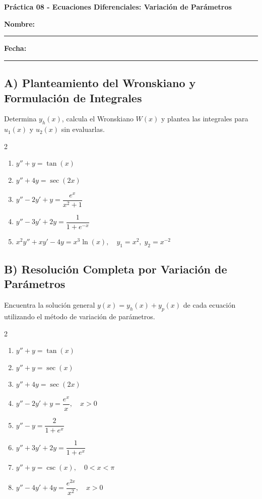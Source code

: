 \documentclass[a4paper,11pt]{article}
\begin{document}
\begin{center}
    \Large\textbf{Práctica 08 - Ecuaciones Diferenciales: Variación de Parámetros}\\[0.5cm]  
\end{center}
  \textbf{Nombre:} \rule{9cm}{0.4pt}  \textbf{Fecha:} \rule{4.5cm}{0.4pt}

\vspace{0.3cm}

\subsection*{A) Planteamiento del Wronskiano y Formulación de Integrales}
Determina $y_h(x)$, calcula el Wronskiano $W(x)$ y plantea las integrales para $u_1(x)$ y $u_2(x)$ sin evaluarlas.

\begin{multicols}{2}
\begin{enumerate}[itemsep=0.15cm]
    \item $y'' + y = \tan(x)$
    \item $y'' + 4y = \sec(2x)$
    \item $y'' - 2y' + y = \dfrac{e^x}{x^2 + 1}$
    \item $y'' - 3y' + 2y = \dfrac{1}{1 + e^{-x}}$
    \item $x^2 y'' + x y' - 4y = x^3 \ln(x), \quad y_1 = x^2, \; y_2 = x^{-2}$
\end{enumerate}
\end{multicols}

\subsection*{B) Resolución Completa por Variación de Parámetros}
Encuentra la solución general $y(x) = y_h(x) + y_p(x)$ de cada ecuación utilizando el método de variación de parámetros.

\begin{multicols}{2}
\begin{enumerate}[itemsep=0.15cm]
    \item $y'' + y = \tan(x)$
    \item $y'' + y = \sec(x)$
    \item $y'' + 4y = \sec(2x)$
    \item $y'' - 2y' + y = \dfrac{e^x}{x}, \quad x > 0$
    \item $y'' - y = \dfrac{2}{1 + e^x}$
    \item $y'' + 3y' + 2y = \dfrac{1}{1 + e^x}$
    \item $y'' + y = \csc(x), \quad 0 < x < \pi$
    \item $y'' - 4y' + 4y = \dfrac{e^{2x}}{x^2}, \quad x > 0$
\end{enumerate}
\end{multicols}
\end{document}
